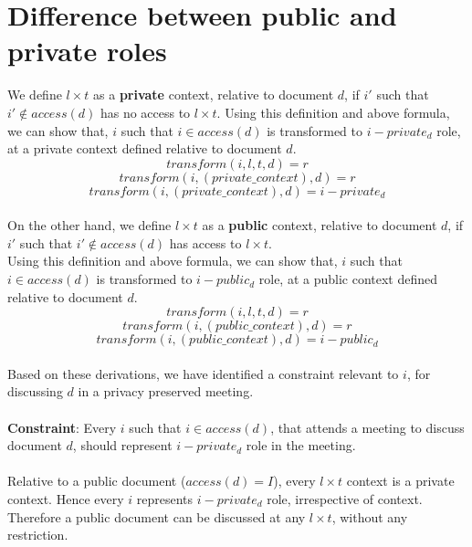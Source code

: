 \documentclass{article}
\begin{document}
\section{Difference between public and private roles}
We define $l \times t$ as a \textbf{private} context, relative to document $d$, if $i'$ such that $i' \notin access(d)$ has no access to $l \times t$. Using this definition and above formula, we can show that, $i$ such that $i \in access(d)$ is transformed to $i-private_{d}$ role, at a private context defined relative to document $d$.
\[ transform(i, l, t, d) = r \]
\[ transform(i, (private\_context), d) = r \]
\[ transform(i, (private\_context), d) = i-private_{d} \] \\

\noindent
On the other hand, we define $l \times t$ as a \textbf{public} context, relative to document $d$, if $i'$ such that $i' \notin access(d)$ has access to $l \times t$.\\
Using this definition and above formula, we can show that, $i$ such that $i \in access(d)$ is transformed to $i-public_{d}$ role, at a public context defined relative to document $d$.
\[ transform(i, l, t, d) = r \]
\[ transform(i, (public\_context), d) = r \]
\[ transform(i, (public\_context), d) = i-public_{d} \] \\
\noindent
Based on these derivations, we have identified a constraint relevant to $i$, for discussing $d$ in a privacy preserved meeting.\\ \\
\textbf{Constraint}: Every $i$ such that $i \in access(d)$, that attends a meeting to discuss document $d$, should represent $i-private_{d}$ role in the meeting.\\ \\
Relative to a public document ($access(d) = I$), every $l \times t$ context is a private context. Hence every $i$ represents $i-private_{d}$ role, irrespective of context. Therefore a public document can be discussed at any $l \times t$, without any restriction.\\ \\
\end{document}
